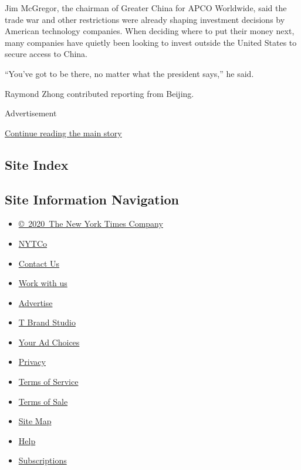Jim McGregor, the chairman of Greater China for APCO Worldwide, said the
trade war and other restrictions were already shaping investment
decisions by American technology companies. When deciding where to put
their money next, many companies have quietly been looking to invest
outside the United States to secure access to China.

``You've got to be there, no matter what the president says,'' he said.

Raymond Zhong contributed reporting from Beijing.

Advertisement

\protect\hyperlink{after-bottom}{Continue reading the main story}

\hypertarget{site-index}{%
\subsection{Site Index}\label{site-index}}

\hypertarget{site-information-navigation}{%
\subsection{Site Information
Navigation}\label{site-information-navigation}}

\begin{itemize}
\tightlist
\item
  \href{https://help.nytimes.com/hc/en-us/articles/115014792127-Copyright-notice}{©~2020~The
  New York Times Company}
\end{itemize}

\begin{itemize}
\tightlist
\item
  \href{https://www.nytco.com/}{NYTCo}
\item
  \href{https://help.nytimes.com/hc/en-us/articles/115015385887-Contact-Us}{Contact
  Us}
\item
  \href{https://www.nytco.com/careers/}{Work with us}
\item
  \href{https://nytmediakit.com/}{Advertise}
\item
  \href{http://www.tbrandstudio.com/}{T Brand Studio}
\item
  \href{https://www.nytimes.com/privacy/cookie-policy\#how-do-i-manage-trackers}{Your
  Ad Choices}
\item
  \href{https://www.nytimes.com/privacy}{Privacy}
\item
  \href{https://help.nytimes.com/hc/en-us/articles/115014893428-Terms-of-service}{Terms
  of Service}
\item
  \href{https://help.nytimes.com/hc/en-us/articles/115014893968-Terms-of-sale}{Terms
  of Sale}
\item
  \href{https://spiderbites.nytimes.com}{Site Map}
\item
  \href{https://help.nytimes.com/hc/en-us}{Help}
\item
  \href{https://www.nytimes.com/subscription?campaignId=37WXW}{Subscriptions}
\end{itemize}
